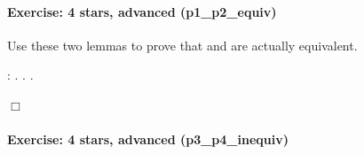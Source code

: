 \documentclass[12pt]{report}
\begin{document}
\paragraph{Exercise: 4 stars, advanced (p1\_p2\_equiv)}




    Use these two lemmas to prove that  and  are actually
    equivalent. 
\begin{coqdoccode}
\coqdocemptyline
\coqdocnoindent
{}  :   .\coqdoceol
\coqdocnoindent
{}.  .\coqdoceol
\end{coqdoccode}
\ensuremath{\Box} 

\paragraph{Exercise: 4 stars, advanced (p3\_p4\_inequiv)}
\end{document}
